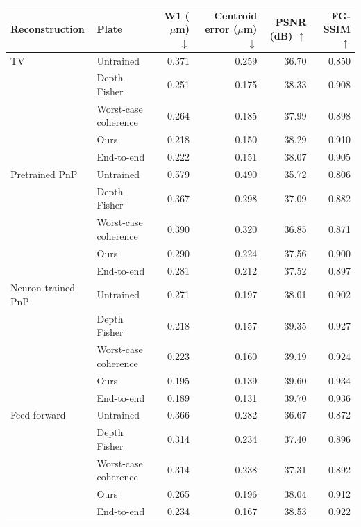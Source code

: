 \begin{tabular}{@{}llrrrr@{}}
\toprule
Reconstruction & Plate & W1 ($\mu$m) $\downarrow$ & Centroid error ($\mu$m) $\downarrow$ & PSNR (dB) $\uparrow$ & FG-SSIM $\uparrow$ \\
\midrule
TV & Untrained & 0.371 & 0.259 & 36.70 & 0.850 \\
 & Depth Fisher & 0.251 & 0.175 & 38.33 & 0.908 \\
 & Worst-case coherence & 0.264 & 0.185 & 37.99 & 0.898 \\
 & Ours & 0.218 & 0.150 & 38.29 & 0.910 \\
 & End-to-end & 0.222 & 0.151 & 38.07 & 0.905 \\
\midrule
Pretrained PnP & Untrained & 0.579 & 0.490 & 35.72 & 0.806 \\
 & Depth Fisher & 0.367 & 0.298 & 37.09 & 0.882 \\
 & Worst-case coherence & 0.390 & 0.320 & 36.85 & 0.871 \\
 & Ours & 0.290 & 0.224 & 37.56 & 0.900 \\
 & End-to-end & 0.281 & 0.212 & 37.52 & 0.897 \\
\midrule
Neuron-trained PnP & Untrained & 0.271 & 0.197 & 38.01 & 0.902 \\
 & Depth Fisher & 0.218 & 0.157 & 39.35 & 0.927 \\
 & Worst-case coherence & 0.223 & 0.160 & 39.19 & 0.924 \\
 & Ours & 0.195 & 0.139 & 39.60 & 0.934 \\
 & End-to-end & 0.189 & 0.131 & 39.70 & 0.936 \\
\midrule
Feed-forward & Untrained & 0.366 & 0.282 & 36.67 & 0.872 \\
 & Depth Fisher & 0.314 & 0.234 & 37.40 & 0.896 \\
 & Worst-case coherence & 0.314 & 0.238 & 37.31 & 0.892 \\
 & Ours & 0.265 & 0.196 & 38.04 & 0.912 \\
 & End-to-end & 0.234 & 0.167 & 38.53 & 0.922 \\
\bottomrule
\end{tabular}
